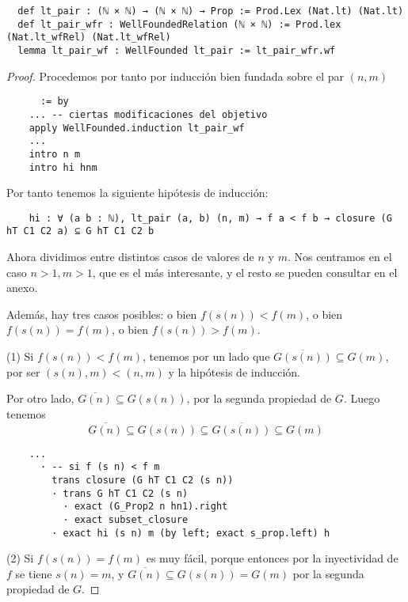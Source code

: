 \begin{lstlisting}
  def lt_pair : (ℕ × ℕ) → (ℕ × ℕ) → Prop := Prod.Lex (Nat.lt) (Nat.lt)
  def lt_pair_wfr : WellFoundedRelation (ℕ × ℕ) := Prod.lex (Nat.lt_wfRel) (Nat.lt_wfRel)
  lemma lt_pair_wf : WellFounded lt_pair := lt_pair_wfr.wf
\end{lstlisting}

\begin{proof}
  Procedemos por tanto por inducción bien fundada sobre el par $(n, m)$

  \begin{lstlisting}
      := by
    ... -- ciertas modificaciones del objetivo
    apply WellFounded.induction lt_pair_wf
    ...
    intro n m
    intro hi hnm \end{lstlisting}

  Por tanto tenemos la siguiente hipótesis de inducción:

  \begin{lstlisting}
    hi : ∀ (a b : ℕ), lt_pair (a, b) (n, m) → f a < f b → closure (G hT C1 C2 a) ⊆ G hT C1 C2 b \end{lstlisting}

  Ahora dividimos entre distintos casos de valores de $n$ y $m$. Nos centramos en el caso $n >1, m>1$, que es el más interesante, y el resto se pueden consultar en el anexo.

  Además, hay tres casos posibles: o bien $f(s(n)) < f(m)$, o bien $f(s(n)) = f(m)$, o bien $f(s(n)) > f(m)$.

  (1) Si $f(s(n)) < f(m)$, tenemos por un lado que $\overline{G(s(n))} \subseteq G(m)$, por ser $(s(n), m) < (n, m)$ y la hipótesis de inducción.

  Por otro lado, $\overline{G(n)} \subseteq G(s(n))$, por la segunda propiedad de $G$. Luego tenemos
  $$
  \overline{G(n)} \subseteq G(s(n)) \subseteq \overline{G(s(n))} \subseteq G(m)
  $$

  \begin{lstlisting}
    ...
      · -- si f (s n) < f m
        trans closure (G hT C1 C2 (s n))
        · trans G hT C1 C2 (s n)
          · exact (G_Prop2 n hn1).right
          · exact subset_closure
        · exact hi (s n) m (by left; exact s_prop.left) h \end{lstlisting}

  (2) Si $f(s(n)) = f(m)$ es muy fácil, porque entonces por la inyectividad de $f$ se tiene $s(n)= m$, y $\overline{G(n)} \subseteq G(s(n)) = G(m)$ por la segunda propiedad de $G$.


\end{proof}
